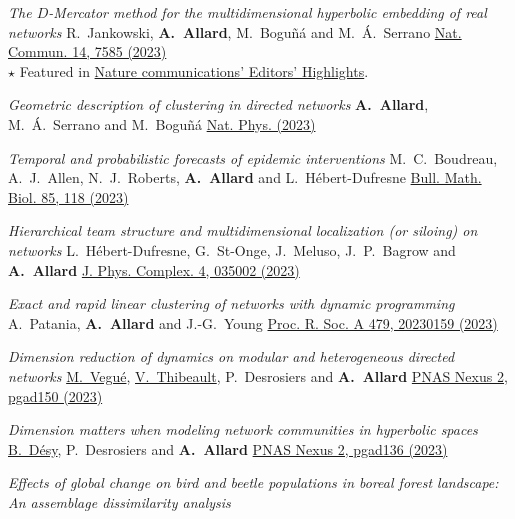 \documentclass[11pt]{article}
\makeatletter
\newcommand{\reversearabic}[1]{\expandafter\@reversearabic\csname c@#1\endcsname}
\newcommand{\@reversearabic}[1]{%
  \number\numexpr\getrefnumber{this@etaremune@\romannumeral\c@etaremune}-#1+1\relax
}
\newcounter{etaremune}
\newenvironment{etaremune}[1][]{%
  \stepcounter{etaremune}%
  \begin{enumerate}[label=\reversearabic*.,#1]%
}{%
  \edef\@currentlabel{\the\csname c@\@enumctr\endcsname}%
  \label{this@etaremune@\romannumeral\c@etaremune}%
  \end{enumerate}%
}
\makeatother
\begin{document}
\begin{etaremune}[itemsep=0.5em, label={[A\reversearabic*]}]
%
  \item \parbox[t]{\textwidth-30pt}{\textit{The $D$-Mercator method for the multidimensional hyperbolic embedding of real networks}\split
  R.~Jankowski, \textbf{A.~Allard}, M.~Bogu\~n\'a and M.~\'A.~Serrano\split
  \href{https://doi.org/10.1038/s41467-023-43337-5}{Nat. Commun. 14, 7585 (2023)}\\
  {\footnotesize $\star$ Featured in \href{https://www.nature.com/ncomms/editorshighlights}{Nature communications' Editors' Highlights}.}}
%
  \item \parbox[t]{\textwidth-30pt}{\textit{Geometric description of clustering in directed networks}\split
  \textbf{A.~Allard}, M.~\'A.~Serrano and M.~Bogu\~n\'a\split
  \href{https://doi.org/10.1038/s41567-023-02246-6}{Nat. Phys. (2023)}}
%
  \item \parbox[t]{\textwidth-30pt}{\textit{Temporal and probabilistic forecasts of epidemic interventions}\split
  M.~C.~Boudreau, A.~J.~Allen, N.~J.~Roberts, \textbf{A.~Allard} and L.~H\'ebert-Dufresne\split
  \href{https://doi.org/10.1007/s11538-023-01220-w}{Bull. Math. Biol. 85, 118 (2023)}}
%
  \item \parbox[t]{\textwidth-30pt}{\textit{Hierarchical team structure and multidimensional localization (or siloing) on networks}\split
  L.~Hébert-Dufresne, G.~St-Onge, J.~Meluso, J.~P.~Bagrow and \textbf{A.~Allard}\split
  \href{https://doi.org/10.1088/2632-072X/ace602}{J. Phys. Complex. 4, 035002 (2023)}}
%
  \item \parbox[t]{\textwidth-30pt}{\textit{Exact and rapid linear clustering of networks with dynamic programming}\split
  A.~Patania, \textbf{A.~Allard} and J.-G.~Young\split
  \href{https://doi.org/10.1098/rspa.2023.0159}{Proc. R. Soc. A 479, 20230159 (2023)}}
%
  \item \parbox[t]{\textwidth-30pt}{\textit{Dimension reduction of dynamics on modular and heterogeneous directed networks}\split
  \uline{M.~Vegué}, \uline{V.~Thibeault}, P.~Desrosiers and \textbf{A.~Allard}\split
  \href{https://doi.org/10.1093/pnasnexus/pgad150}{PNAS Nexus 2, pgad150 (2023)}}
%
  \item \parbox[t]{\textwidth-30pt}{\textit{Dimension matters when modeling network communities in hyperbolic spaces}\split
  \uline{B.~Désy}, P.~Desrosiers and \textbf{A.~Allard}\split
  \href{https://doi.org/10.1093/pnasnexus/pgad136}{PNAS Nexus 2, pgad136 (2023)}}
%
  \item \parbox[t]{\textwidth-30pt}{\textit{Effects of global change on bird and beetle populations in boreal forest landscape: An assemblage dissimilarity analysis}\split
}
\end{etaremune}
\end{document}
